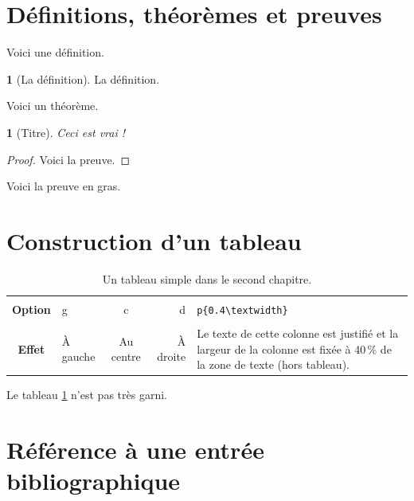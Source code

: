 \documentclass[12pt,twoside,maitrise]{dms}
\newtheorem{theo}[cor]{\theoremname}
\theoremstyle{definition}
\newtheorem{deff}[cor]{\definitionname}
\numberwithin{equation}{section}
\numberwithin{table}{chapter}
\numberwithin{figure}{chapter}
\begin{document}
\section{Définitions, théorèmes et preuves}

Voici une définition.
\begin{deff}[La définition]
	La définition.
\end{deff}
Voici un théorème.
\begin{theo}[Titre]
	Ceci est vrai !
\end{theo}
\begin{proof}
	Voici la preuve.
\end{proof}
\begin{demo}
	Voici la preuve en gras.
\end{demo}

\section{Construction d'un tableau}

\begin{table}[htb]
	\centering
	\begin{tabular}{|c||l|c|r|p{}|}
		\hline          &          &           &          &                                                                                                                           \\
		\textbf{Option} & g        & c         & d        & \verb|p{0.4\textwidth}|                                                                                                   \\[3mm]
		\hline\hline    &          &           &          &                                                                                                                           \\
		\textbf{Effet}  & À gauche & Au centre & À droite & Le texte de cette colonne est justifié et la largeur de la colonne est fixée à 40\,\% de la zone de texte (hors tableau). \\[3mm]
		\hline
	\end{tabular}
	\caption{Un tableau simple dans le second chapitre.}
	\label{tab:simple2}
\end{table}
Le tableau \ref{tab:simple2} n'est pas très garni.

\section{Référence à une entrée bibliographique}
\end{document}
